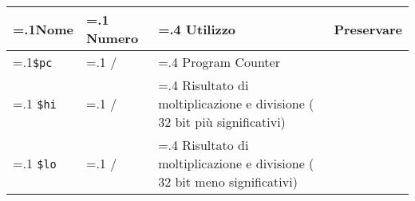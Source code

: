 \documentclass[varwidth=6in]{standalone}
\providecommand\lightrule{%
	\arrayrulecolor{black!30}%
	\midrule[\lightrulewidth]%
	\arrayrulecolor{black}}
\providecommand\register[1]{%
	\texttt{#1}%
}
\begin{document}
	\begin{tabularx}{\textwidth}{ >{\hsize=.1\textwidth}X >{\hsize=.1\textwidth}X >{\hsize=.4\textwidth}X X }
		\toprule
			Nome & Numero & Utilizzo & Preservare \\
		\midrule
			\register{\$pc} & / & Program Counter \\\lightrule
			\register{\$hi} & / & Risultato di moltiplicazione e divisione (\(32\) bit più significativi)\\\lightrule
			\register{\$lo} & / & Risultato di moltiplicazione e divisione (\(32\) bit meno significativi) \\
		\bottomrule
	\end{tabularx}
\end{document}
